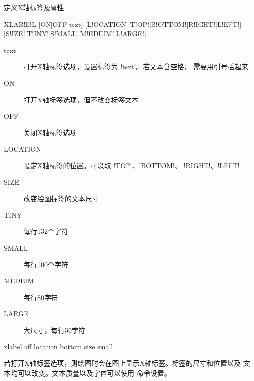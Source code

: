 \label{cmd:xlabel}

定义X轴标签及属性

\begin{SACSTX}
XLAB!E!L [ON|OFF|text] [L!OCATION! T!OP!|B!OTTOM!|R!IGHT!|L!EFT!]
    [S!IZE! T!INY!|S!MALL!|M!EDIUM!|L!ARGE!]
\end{SACSTX}

\begin{description}
\item [text] 打开X轴标签选项，设置标签为 !text!。若文本含空格，
    需要用引号括起来
\item [ON] 打开X轴标签选项，但不改变标签文本
\item [OFF] 关闭X轴标签选项
\item [LOCATION] 设定X轴标签的位置。可以取 !TOP!、!BOTTOM!、
    !RIGHT!、!LEFT!
\item [SIZE] 改变绘图标签的文本尺寸
\item [TINY] 每行132个字符
\item [SMALL] 每行100个字符
\item [MEDIUM] 每行80字符
\item [LARGE] 大尺寸，每行50字符
\end{description}

\begin{SACDFT}
xlabel off location bottom size small
\end{SACDFT}

若打开X轴标签选项，则绘图时会在图上显示X轴标签。标签的尺寸和位置以及
文本均可以改变。文本质量以及字体可以使用  命令设置。
